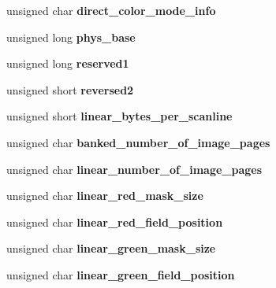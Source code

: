 \begin{DoxyCompactItemize}
unsigned char {\bfseries direct\+\_\+color\+\_\+mode\+\_\+info}
\item 
\mbox{\label{struct____attribute_____ac24fb4abd2382d57baed0ae489873255}} 
unsigned long {\bfseries phys\+\_\+base}
\item 
\mbox{\label{struct____attribute_____a10ea7867c2e557a220233fa9fcedeffb}} 
unsigned long {\bfseries reserved1}
\item 
\mbox{\label{struct____attribute_____ab73ee5a3cf1b9afaf91311b4098c9de3}} 
unsigned short {\bfseries reversed2}
\item 
\mbox{\label{struct____attribute_____a6428cd4fa940857e778fed9f69dd768a}} 
unsigned short {\bfseries linear\+\_\+bytes\+\_\+per\+\_\+scanline}
\item 
\mbox{\label{struct____attribute_____a936d22668e999f141cba9adb3f170520}} 
unsigned char {\bfseries banked\+\_\+number\+\_\+of\+\_\+image\+\_\+pages}
\item 
\mbox{\label{struct____attribute_____a70c219e9cfd7c7c8e7457f5bd6769858}} 
unsigned char {\bfseries linear\+\_\+number\+\_\+of\+\_\+image\+\_\+pages}
\item 
\mbox{\label{struct____attribute_____abde7a22ad0fd0a9ac43808af0c9173b8}} 
unsigned char {\bfseries linear\+\_\+red\+\_\+mask\+\_\+size}
\item 
\mbox{\label{struct____attribute_____a91e7bb035be6009dd75741396df86c15}} 
unsigned char {\bfseries linear\+\_\+red\+\_\+field\+\_\+position}
\item 
\mbox{\label{struct____attribute_____a787f553faec286ed29987f5236b54fc5}} 
unsigned char {\bfseries linear\+\_\+green\+\_\+mask\+\_\+size}
\item 
\mbox{\label{struct____attribute_____a00b2004032b5efa5ba5eee74caa17d09}} 
unsigned char {\bfseries linear\+\_\+green\+\_\+field\+\_\+position}
\item 

\end{DoxyCompactItemize}

